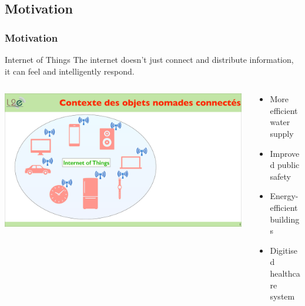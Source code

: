 \documentclass[compress]{beamer}
\begin{document}
\subsection{Motivation}
\begin{frame}\frametitle{Motivation}
\vspace{-15.5pt}
\begin{block}{Internet of Things}
	The internet doesn't just connect and distribute information, it can feel and intelligently respond.
	\end{block}
\begin{columns}[totalwidth=\textwidth] 
   \begin{column}{.66\textwidth} 
   \includegraphics[width=0.99\textwidth]{Graphic/IllusIoT.pdf}
   \end{column}
   \begin{column}{.34\textwidth}
       \begin{exampleblock}{} 
              \begin{itemize}[label=$\bullet$, font=\small, leftmargin=*]
				\item More efficient water supply
				\item Improved public safety
				\item Energy-efficient buildings
				\item Digitised healthcare system
			\end{itemize}
       \end{exampleblock}
   \end{column}
\end{columns}
\end{frame}
\end{document}
